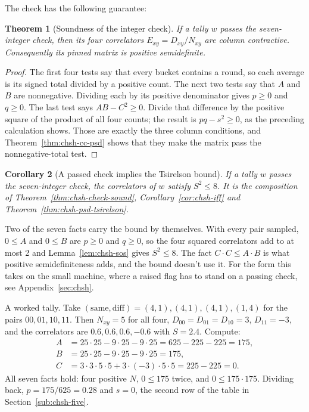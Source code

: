 \documentclass[11pt,twoside]{article}
\theoremstyle{thielethm}
\newtheorem{theorem}{Theorem}[section]
\newtheorem{corollary}[theorem]{Corollary}
\theoremstyle{thieledef}
\theoremstyle{thieledef}
\theoremstyle{thieledef}
\theoremstyle{thielethm}
\theoremstyle{thieleobs}
\theoremstyle{thielethm}
\begin{document}
The check has the following guarantee:

\begin{theorem}[Soundness of the integer check]
If a tally $w$ passes the seven-integer check, then its four correlators
$E_{xy}=D_{xy}/N_{xy}$ are column contractive. Consequently its pinned matrix is positive
semidefinite.
\end{theorem}

\begin{proof}
The first four tests say that every bucket contains a round, so each average
is its signed total divided by a positive count. The next two tests say that
$A$ and $B$ are nonnegative. Dividing each by its positive denominator gives
$p\ge0$ and $q\ge0$. The last test says $AB-C^2\ge0$. Divide that difference
by the positive square of the product of all four counts; the result is
$pq-s^2\ge0$, as the preceding calculation shows. Those are exactly the
three column conditions, and Theorem~\ref{thm:chsh-cc-psd} shows that they
make the matrix pass the nonnegative-total test.
\end{proof}

\begin{corollary}[A passed check implies the Tsirelson bound]
If a tally $w$ passes the seven-integer check, the correlators of $w$ satisfy
$S^2 \le 8$. It is the composition of Theorem~\ref{thm:chsh-check-sound},
Corollary~\ref{cor:chsh-iff} and Theorem~\ref{thm:chsh-psd-tsirelson}.\proofclosed \end{corollary} Two of the seven facts carry the bound by themselves. With every pair sampled, $0\le A$ and $0\le B$ are $p\ge0$ and $q\ge0$, so the four squared correlators add to at most 2 and Lemma~\ref{lem:chsh-sos} gives $S^2\le8$. The fact $C\cdot C\le A\cdot B$ is what positive semidefiniteness adds, and the bound doesn't use it.
For the form this takes on the small machine, where a raised flag has to stand on a passing
check, see Appendix~\ref{sec:chsh}.

A worked tally. Take $(\mathrm{same}, \mathrm{diff}) = (4,1), (4,1), (4,1), (1,4)$ for the
pairs $00, 01, 10, 11$. Then $N_{xy} = 5$ for all four, $D_{00} = D_{01} = D_{10} = 3$,
$D_{11} = -3$, and the correlators are $0.6, 0.6, 0.6, -0.6$ with $S = 2.4$. Compute:
\[
\begin{aligned}
A &= 25 \cdot 25 - 9 \cdot 25 - 9 \cdot 25 = 625 - 225 - 225 = 175, \\
B &= 25 \cdot 25 - 9 \cdot 25 - 9 \cdot 25 = 175, \\
C &= 3 \cdot 3 \cdot 5 \cdot 5 + 3 \cdot (-3) \cdot 5 \cdot 5 = 225 - 225 = 0.
\end{aligned}
\]
All seven facts hold: four positive $N$, $0 \le 175$ twice, and $0 \le 175 \cdot 175$.
Dividing back, $p = 175/625 = 0.28$ and $s = 0$, the second row of the table in Section~\ref{sub:chsh-five}.
\end{document}
